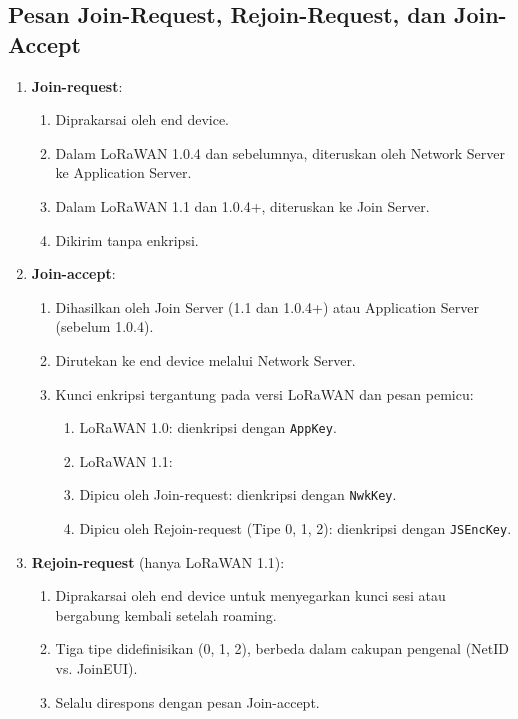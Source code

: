 \subsection{Pesan Join-Request, Rejoin-Request, dan Join-Accept}
\begin{enumerate}
    \item \textbf{Join-request}:
          \begin{enumerate}
              \item Diprakarsai oleh end device.
              \item Dalam LoRaWAN 1.0.4 dan sebelumnya, diteruskan oleh Network Server ke Application Server.
              \item Dalam LoRaWAN 1.1 dan 1.0.4+, diteruskan ke Join Server.
              \item Dikirim tanpa enkripsi.
          \end{enumerate}
    \item \textbf{Join-accept}:
          \begin{enumerate}
              \item Dihasilkan oleh Join Server (1.1 dan 1.0.4+) atau Application Server (sebelum 1.0.4).
              \item Dirutekan ke end device melalui Network Server.
              \item Kunci enkripsi tergantung pada versi LoRaWAN dan pesan pemicu:
                    \begin{enumerate}
                        \item LoRaWAN 1.0: dienkripsi dengan \texttt{AppKey}.
                        \item LoRaWAN 1.1:
                        \item Dipicu oleh Join-request: dienkripsi dengan \texttt{NwkKey}.
                        \item Dipicu oleh Rejoin-request (Tipe 0, 1, 2): dienkripsi dengan \texttt{JSEncKey}.
                    \end{enumerate}
          \end{enumerate}
    \item \textbf{Rejoin-request} (hanya LoRaWAN 1.1):
          \begin{enumerate}
              \item Diprakarsai oleh end device untuk menyegarkan kunci sesi atau bergabung kembali setelah roaming.
              \item Tiga tipe didefinisikan (0, 1, 2), berbeda dalam cakupan pengenal (NetID vs. JoinEUI).
              \item Selalu direspons dengan pesan Join-accept.
          \end{enumerate}
\end{enumerate}
